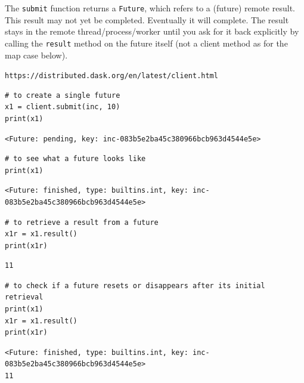 The \verb+submit+ function returns a \verb+Future+, which refers to a (future) remote result. This result may not yet be completed. Eventually it will complete. The result stays in the remote thread/process/worker until you ask for it back explicitly by calling the \verb+result+ method on the future itself (not a client method as for the map case below).


\lstinline{https://distributed.dask.org/en/latest/client.html}



\begin{lstlisting}[style=incellstyle]
# to create a single future
x1 = client.submit(inc, 10)
print(x1)
\end{lstlisting}


\begin{lstlisting}[style=outcellstyle]
<Future: pending, key: inc-083b5e2ba45c380966bcb963d4544e5e>

\end{lstlisting}


\begin{lstlisting}[style=incellstyle]
# to see what a future looks like
print(x1)
\end{lstlisting}


\begin{lstlisting}[style=outcellstyle]
<Future: finished, type: builtins.int, key: inc-083b5e2ba45c380966bcb963d4544e5e>

\end{lstlisting}


\begin{lstlisting}[style=incellstyle]
# to retrieve a result from a future
x1r = x1.result()
print(x1r)
\end{lstlisting}


\begin{lstlisting}[style=outcellstyle]
11

\end{lstlisting}


\begin{lstlisting}[style=incellstyle]
# to check if a future resets or disappears after its initial retrieval
print(x1)
x1r = x1.result()
print(x1r)
\end{lstlisting}


\begin{lstlisting}[style=outcellstyle]
<Future: finished, type: builtins.int, key: inc-083b5e2ba45c380966bcb963d4544e5e>
11

\end{lstlisting}

